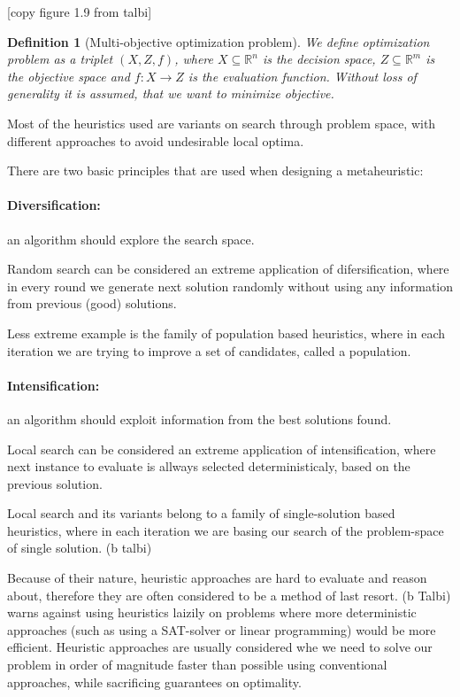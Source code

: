 \documentclass[12pt,oneside,draft]{fithesis2}
\newtheorem{defn}{Definition}
\begin{document}
[copy figure 1.9 from talbi]

\begin{defn}[Multi-objective optimization problem]
We define optimization problem as a triplet $(X,Z,f)$, where $X \subseteq \mathbb{R}^n$ is the decision space, $Z \subseteq \mathbb{R}^m$ is the objective space and $f:X \to Z$ is the evaluation function.
Without loss of generality it is assumed, that we want to minimize objective.
\end{defn}

Most of the heuristics used are variants on search through problem space, with different approaches to avoid undesirable local optima.

There are two basic principles that are used when designing a metaheuristic:

\paragraph{Diversification:}
an algorithm should explore the search space.

Random search can be considered an extreme application of difersification, where in every round we generate next solution randomly without using any information from previous (good) solutions.

Less extreme example is the family of population based heuristics, where in each iteration we are trying to improve a set of candidates, called a population.

\paragraph{Intensification:} an algorithm should exploit information from the best solutions found.

Local search can be considered an extreme application of intensification, where next instance to evaluate is allways selected deterministicaly, based on the previous solution.

Local search and its variants belong to a family of single-solution based heuristics, where in each iteration we are basing our search of the problem-space of single solution.
(b talbi)

Because of their nature, heuristic approaches are hard to evaluate and reason about, therefore they are often considered to be a method of last resort. (b Talbi) warns against using heuristics laizily on problems where more deterministic approaches (such as using a SAT-solver or linear programming) would be more efficient. Heuristic approaches are usually considered whe we need to solve our problem in order of magnitude faster than possible using conventional approaches, while sacrificing guarantees on optimality.
\end{document}
